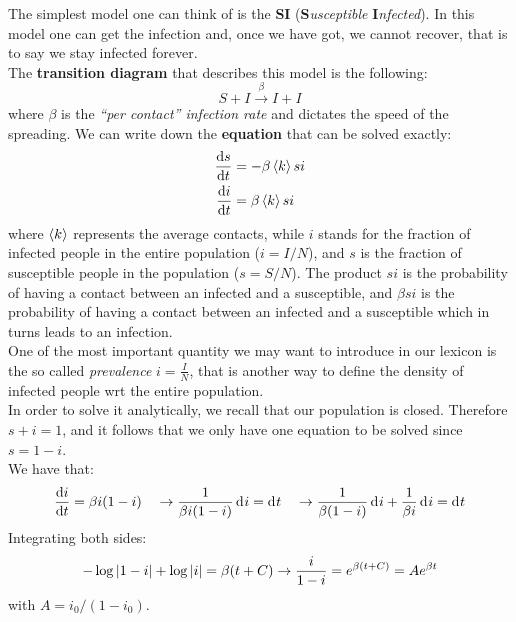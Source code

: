 \documentclass[../main/main.tex]{subfiles}
\begin{document}
The simplest model one can think of is the \textbf{SI} (\textbf{S}\textit{usceptible} \textbf{I}\textit{nfected}). In this model one can get the infection and, once we have got, we cannot recover, that is to say we stay infected forever.\\
The \textbf{transition diagram} that describes this model is the following:
\begin{equation}
  S + I \overset{\beta }{\rightarrow} I + I
\end{equation}
where $\beta$ is the \textit{“per contact” infection rate} and dictates the speed of the spreading. We can write down the \textbf{equation} that can be solved exactly:
\begin{equation}
\begin{split}
  \dv{s}{t} &= - \beta \expval{k} s i \\ \dv{i}{t} &= \beta \expval{k} s i
\end{split}
\end{equation}
where $\expval{k}$ represents the average contacts, while $i$ stands for the fraction of infected people in the entire population ($i=I/N$), and $s$ is the fraction of susceptible people in the population ($s=S/N$).
The product $s i$ is the probability of having a contact between an infected and a susceptible, and $\beta  s i$ is the probability of having a contact between an infected and a susceptible which in turns leads to an infection.\\
One of the most important quantity we may want to introduce in our lexicon is the so called \textit{prevalence} $i = \frac{I}{N}$, that is another way to define the density of infected people wrt the entire population.\\
In order to solve it analytically, we recall that our population is closed. Therefore $s+i=1$, and it follows that we only have one equation to be solved since $s=1-i$.\\
We have that:
\begin{equation*}
  \dv{i}{t} = \beta i (1-i) \quad \rightarrow \frac{1}{\beta i (1-i)} \dd[]{i} = \dd[]{t} \quad \rightarrow \frac{1}{\beta (1-i)} \dd[]{i} + \frac{1}{\beta i} \dd[]{i} = \dd[]{t}
\end{equation*}
Integrating both sides:
\begin{equation*}
  - \log \abs{1-i} + \log \abs{i} = \beta (t+C) \rightarrow \frac{i}{1-i} = e^{\beta (t+C)} = A e^{\beta t}
\end{equation*}
with \( A = i_0/(1-i_0) \).
\end{document}
